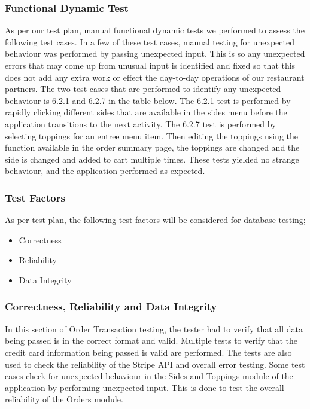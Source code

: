 \documentclass[12pt, titlepage]{article}
\begin{document}
\subsubsection{Functional Dynamic Test}
As per our test plan, manual functional dynamic tests we performed to assess the following test cases. In a few of these test cases, manual testing for unexpected behaviour was performed by passing unexpected input. This is so any unexpected errors that may come up from unusual input is identified and fixed so that this does not add any extra work or effect the day-to-day operations of our restaurant partners. The two test cases that are performed to identify any unexpected behaviour is 6.2.1 and 6.2.7 in the table below. The 6.2.1 test is performed by rapidly clicking different sides that are available in the sides menu before the application transitions to the next activity. The 6.2.7 test is performed by selecting toppings for an entree menu item. Then editing the toppings using the function available in the order summary page, the toppings are changed and the side is changed and added to cart multiple times. These tests yielded no strange behaviour, and the application performed as expected. 


\subsubsection{Test Factors}
As per test plan, the following test factors will be considered for database testing;
\begin{itemize}
 \item Correctness
 \item Reliability
 \item Data Integrity
 \end{itemize}
\subsubsection{Correctness, Reliability and Data Integrity}
In this section of Order Transaction testing, the tester had to verify that all data being passed is in the correct format and valid. Multiple tests to verify that the credit card information being passed is valid are performed. The tests are also used to check the reliability of the Stripe API and overall error testing. Some test cases check for unexpected behaviour in the Sides and Toppings module of the application by performing unexpected input. This is done to test the overall reliability of the Orders module.    
\end{document}
